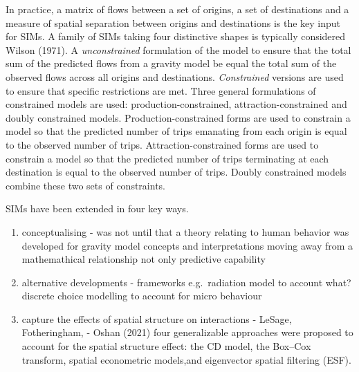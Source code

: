 \documentclass[11pt,letterpaper]{article}
\begin{document}
In practice, a matrix of flows between a set of origins, a set of destinations and a measure of spatial separation between origins and destinations is the key input for SIMs.
A family of SIMs taking four distinctive shapes is typically considered Wilson (1971).
A \emph{unconstrained} formulation of the model to ensure that the total sum of the predicted flows from a gravity model be equal the total sum of the observed flows across all origins and destinations.
\emph{Constrained} versions are used to ensure that specific restrictions are met.
Three general formulations of constrained models are used: production-constrained, attraction-constrained and doubly constrained models.
Production-constrained forms are used to constrain a model so that the predicted number of trips emanating from each origin is equal to the observed number of trips.
Attraction-constrained forms are used to constrain a model so that the predicted number of trips terminating at each destination is equal to the observed number of trips.
Doubly constrained models combine these two sets of constraints.

SIMs have been extended in four key ways.

\begin{enumerate}
\def\labelenumi{(\arabic{enumi})}
\item
  conceptualising - was not until that a theory relating to human behavior was developed for gravity model concepts and interpretations moving away from a mathemathical relationship not only predictive capability
\item
  alternative developments - frameworks e.g.~radiation model to account what?
  discrete choice modelling to account for micro behaviour
\item
  capture the effects of spatial structure on interactions - LeSage, Fotheringham, - Oshan (2021) four generalizable approaches were proposed to account for the spatial structure effect: the CD model, the Box--Cox transform, spatial econometric models,and eigenvector spatial filtering (ESF).
\end{enumerate}
\end{document}
